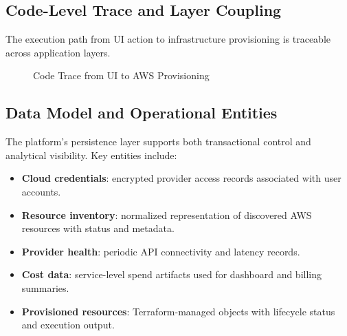 \subsection{Code-Level Trace and Layer Coupling}
The execution path from UI action to infrastructure provisioning is traceable across application layers.

\begin{figure}[h]
\centering
{}
\caption{Code Trace from UI to AWS Provisioning}
\label{fig:code_trace}
\end{figure}

\subsection{Data Model and Operational Entities}
The platform's persistence layer supports both transactional control and analytical visibility. Key entities include:
\begin{itemize}
    \item \textbf{Cloud credentials}: encrypted provider access records associated with user accounts.
    \item \textbf{Resource inventory}: normalized representation of discovered AWS resources with status and metadata.
    \item \textbf{Provider health}: periodic API connectivity and latency records.
    \item \textbf{Cost data}: service-level spend artifacts used for dashboard and billing summaries.
    \item \textbf{Provisioned resources}: Terraform-managed objects with lifecycle status and execution output.
\end{itemize}

